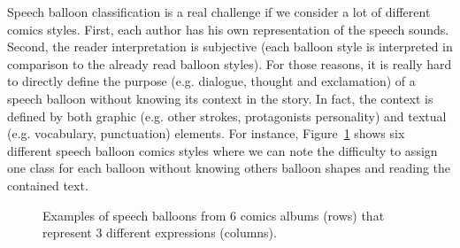 Speech balloon classification is a real challenge if we consider a lot of different comics styles.
First, each author has his own representation of the speech sounds. Second, the reader interpretation is subjective (each balloon style is interpreted in comparison to the already read balloon styles).
For those reasons, it is really hard to directly define the purpose (e.g. dialogue, thought and exclamation) of a speech balloon without knowing its context in the story.
In fact, the context is defined by both graphic (e.g. other strokes, protagonists personality) and textual (e.g. vocabulary, punctuation) elements.
For instance, Figure~\ref{fig:in:contour_style} shows six different speech balloon comics styles where we can note the difficulty to assign one class for each balloon without knowing others balloon shapes and reading the contained text.



	\begin{figure}[!ht]	%
	  \centering
		\caption[Relation between speech balloon shape and contour informations]{Examples of speech balloons from 6 comics albums (rows) that represent 3 different expressions (columns).}
		\label{fig:in:contour_style}
	\end{figure}


